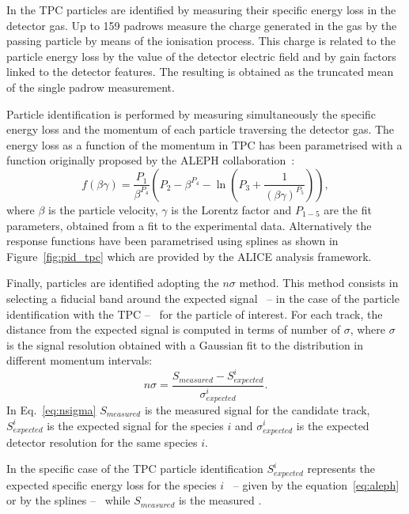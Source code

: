 In the TPC particles are identified by measuring their specific energy loss in the detector gas.
Up to 159 padrows measure the charge generated in the gas by the passing particle by means of the
ionisation process. 
This charge is related to the particle energy loss by the value of the detector electric
field and by gain factors linked to the detector features. 
The resulting \dedx is obtained as the truncated mean of the single padrow measurement.

Particle identification is performed by measuring simultaneously the specific energy loss \dedx 
and the momentum of each particle traversing the detector gas.
The energy loss as a function of the momentum in TPC has been parametrised with a function originally
proposed by the ALEPH collaboration~\cite{aleph}:
\begin{equation} \label{eq:aleph}
    f(\beta \gamma) = \frac{P_{1}}{\beta^{P_{4}}} \left( P_{2} - \beta^{P_{4}}
    - \ln \left( P_{3} + \frac{1}{(\beta \gamma)^{P_{5}}} \right) \right),
\end{equation} 
where $\beta$ is the particle velocity, $\gamma$ is the Lorentz factor and $P_{1-5}$ are the fit
parameters, obtained from a fit to the experimental data.
Alternatively the response functions have been parametrised using splines as shown in 
Figure~\ref{fig:pid_tpc} which are provided by the ALICE analysis framework.

Finally, particles are identified adopting the $n\sigma$ method.
This method consists in selecting a fiducial band around the expected signal \ -- \dedx in the case of
the  particle identification with the TPC -- \ for the particle of interest.
For each track, the distance from the expected signal is computed in terms of 
number of $\sigma$, where $\sigma$ is the signal resolution obtained with a Gaussian fit to the 
\dedx distribution in different momentum intervals:
\begin{equation} \label{eq:nsigma}
    n\sigma = \frac{S_{measured} - S^{i}_{expected}}{\sigma^{i}_{expected}}.
\end{equation}
In Eq.~\eqref{eq:nsigma} $S_{measured}$ is the measured signal for the candidate track,
$S^{i}_{expected}$ is the expected signal for the species $i$ and $\sigma^{i}_{expected}$ is the
expected detector resolution for the same species $i$.

In the specific case of the TPC particle identification $S^{i}_{expected}$ represents the
expected specific energy loss for the species $i$ \ -- given by the equation~\eqref{eq:aleph}
or by the splines -- \ while $S_{measured}$ is the measured \dedx.

